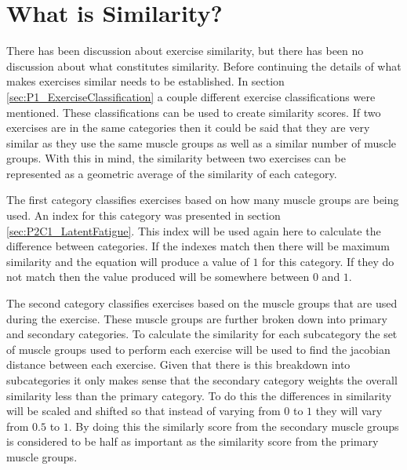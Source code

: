 

\section{What is Similarity?}
\label{sec:P2C1_WhatIsSimilarity}

There has been discussion about exercise similarity, but there has been no discussion about what constitutes similarity. Before continuing the details of what makes exercises similar needs to be established. In section \ref{sec:P1_ExerciseClassification} a couple different exercise classifications were mentioned. These classifications can be used to create similarity scores. If two exercises are in the same categories then it could be said that they are very similar as they use the same muscle groups as well as a similar number of muscle groups. With this in mind, the similarity between two exercises can be represented as a geometric average of the similarity of each category.

The first category classifies exercises based on how many muscle groups are being used. An index for this category was presented in section \ref{sec:P2C1_LatentFatigue}. This index will be used again here to calculate the difference between categories. If the indexes match then there will be maximum similarity and the equation will produce a value of $1$ for this category. If they do not match then the value produced will be somewhere between $0$ and $1$.

The second category classifies exercises based on the muscle groups that are used during the exercise. These muscle groups are further broken down into primary and secondary categories. To calculate the similarity for each subcategory the set of muscle groups used to perform each exercise will be used to find the jacobian distance between each exercise. Given that there is this breakdown into subcategories it only makes sense that the secondary category weights the overall similarity less than the primary category. To do this the differences in similarity will be scaled and shifted so that instead of varying from $0$ to $1$ they will vary from $0.5$ to $1$. By doing this the similarly score from the secondary muscle groups is considered to be half as important as the similarity score from the primary muscle groups.

